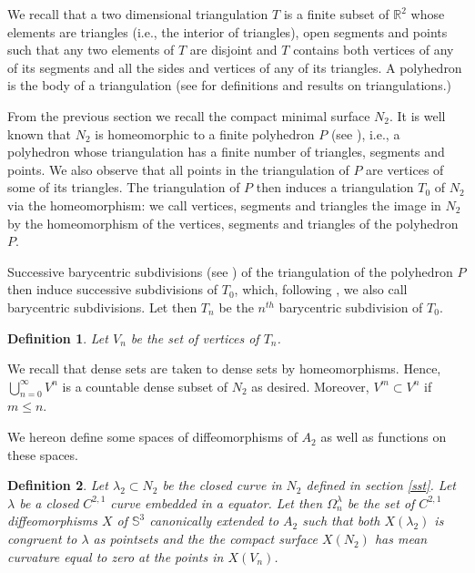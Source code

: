 \documentclass{article}
\def\S3{{\mathbb S^3}}
\newtheorem{definition}{Definition}[section]
\begin{document}
We recall that a two dimensional triangulation  $T$ is a finite subset of $\mathbb R^2$ whose elements are triangles (i.e., the interior of triangles), open segments and points such that any two elements of $T$ are disjoint and $T$ contains both vertices of any of its segments and all the sides and vertices of any of its triangles. A polyhedron is  the body of a triangulation (see \cite{al} for definitions and results on triangulations.)


From the previous section we recall the compact minimal surface $N_2$. It is well known that $N_2$ is homeomorphic to a finite polyhedron $P$ (see \cite[Remark, p. 74]{al}), i.e., a polyhedron whose triangulation has a finite number of triangles, segments and points. We also observe that all points in the triangulation of $P$ are vertices of some of its triangles. The triangulation of $P$ then induces  
a triangulation $T_0$ of $N_2$ via the homeomorphism: we call vertices, segments and triangles the image in $N_2$ by the homeomorphism of the vertices, segments and triangles of the polyhedron $P$.

 Successive  barycentric subdivisions (see \cite[p. 78]{al})  of the triangulation of the polyhedron $P$ then induce successive subdivisions of $T_0$, which, following \cite{al}, we also call barycentric subdivisions. Let then $T_n$ be the $n^{th}$ barycentric subdivision  of $T_0$.  


\begin{definition} \label{dvn} Let $V_n$ be the set of vertices of $T_n$.
\end{definition}

We recall that dense sets are taken to dense sets by homeomorphisms.  Hence, $\bigcup_{n=0}^{\infty} V^n$ is a countable dense subset of $N_2$ as desired. Moreover, $V^m\subset V^n$ if $m\leq n$.

 
We hereon define some spaces of diffeomorphisms of $A_2$ as well as functions on these spaces.


\begin{definition}\label{d0} Let $\lambda_2\subset N_2$ be the closed curve in $N_2$ defined in section \ref{sst}. 
Let $\lambda$ be a closed $C^{2,1}$ curve embedded in a equator. Let then $\Omega_{n}^\lambda$ be the set of  $C^{2,1}$ diffeomorphisms $X$ of $\S3$ canonically extended to $A_2$ such that both $X(\lambda_2)$ is congruent to $\lambda$  as pointsets and the the compact surface  $X(N_2)$
has mean curvature equal to zero at the points in $X(V_n)$.
\end{definition}
\end{document}
